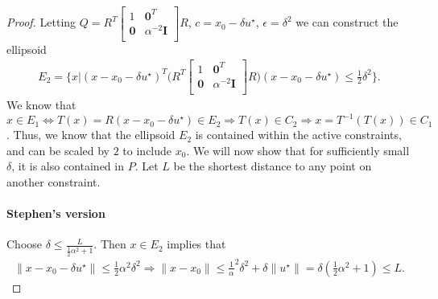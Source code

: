\begin{proof}
Letting $Q = R^T\begin{bmatrix}
1 & \boldsymbol0^T \\
\boldsymbol 0 & \alpha^{-2} \boldsymbol I \\
\end{bmatrix}R$, $c = x_0 - \delta u^{\star}$, $\epsilon = \delta^2$
we can construct the ellipsoid
\begin{align*}
E_2 = \bigg \{x \bigg | (x - x_0 - \delta u^{\star})^T\bigg(R^T\begin{bmatrix}
1 & \boldsymbol0^T \\
\boldsymbol 0 & \alpha^{-2} \boldsymbol I \\
\end{bmatrix}R\bigg)(x - x_0 - \delta u^{\star}) \le \frac 1 2 \delta^2 \bigg\}.
\end{align*}
We know that $x \in E_1 \Leftrightarrow T(x) = R(x - x_0 - \delta u^{\star}) \in E_2 \Longrightarrow T(x) \in C_2 \Longrightarrow x = T^{-1}\left(T(x)\right) \in C_1$.
Thus, we know that the ellipsoid $E_2$ is contained within the active constraints, and can be scaled by $2$ to include $x_0$.
We will now show that for sufficiently small $\delta$, it is also contained in $P$.
Let $L$ be the shortest distance to any point on another constraint.

\paragraph{Stephen's version}
Choose $\delta \le \frac{L}{\frac 1 2 \alpha^2 + 1}$.
Then $x \in E_2$ implies that 
\begin{align*}
\|x - x_0 -\delta u^{\star}\| \le \frac 1 2 \alpha^2 \delta^2 \Longrightarrow \|x - x_0\| \le \frac 1 \alpha^2 \delta^2 + \delta \|u^{\star}\| = \delta \left(\frac 1 2 \alpha^2 + 1 \right) \le L.
\end{align*}


\end{proof}

